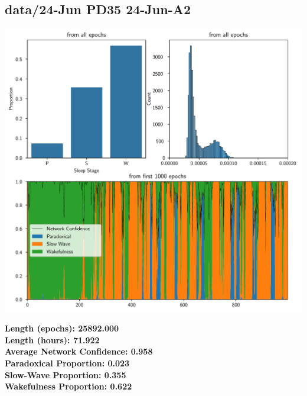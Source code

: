         \subsection*{ data/24-Jun PD35 24-Jun-A2 }
        \begin{center}
        \begin{adjustbox}{width=1\textwidth}
        \includegraphics[page=21]{figs.pdf}
        \end{adjustbox}
        \end{center}
        \large\textbf{Length (epochs): 25892.000}\\
        \textbf{Length (hours): 71.922}\\
        \textbf{Average Network Confidence: 0.958}\\
        \textbf{Paradoxical Proportion: 0.023}\\
        \textbf{Slow-Wave Proportion: 0.355}\\
        \textbf{Wakefulness Proportion: 0.622}\\
        
